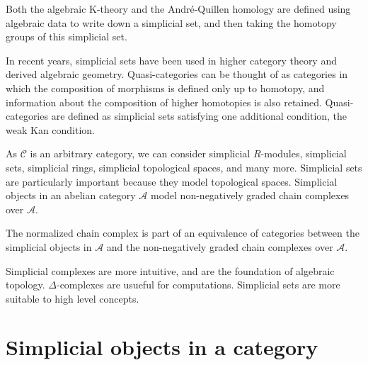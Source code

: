Both the algebraic K-theory and the André-Quillen homology are defined using algebraic data to write down a simplicial set, and then taking the homotopy groups of this simplicial set.



In recent years, simplicial sets have been used in higher category theory and derived algebraic geometry. Quasi-categories can be thought of as categories in which the composition of morphisms is defined only up to homotopy, and information about the composition of higher homotopies is also retained. Quasi-categories are defined as simplicial sets satisfying one additional condition, the weak Kan condition.

As $\mathcal{C}$ is an arbitrary category, we can consider simplicial $R$-modules, simplicial sets, simplicial rings, simplicial topological spaces, and many more. Simplicial sets are particularly important because they model topological spaces. Simplicial objects in an abelian category $\mathcal{A}$ model non-negatively graded chain complexes over $\mathcal{A}$. 

\begin{theo}
The normalized chain complex is part of an equivalence of categories between the simplicial objects in $\mathcal{A}$ and the non-negatively graded chain complexes over $\mathcal{A}$.   
\end{theo}

Simplicial complexes are more intuitive, and are the foundation of algebraic topology. $\Delta$-complexes are usueful for computations. Simplicial sets are more suitable to high level concepts.

\section{Simplicial objects in a category}

